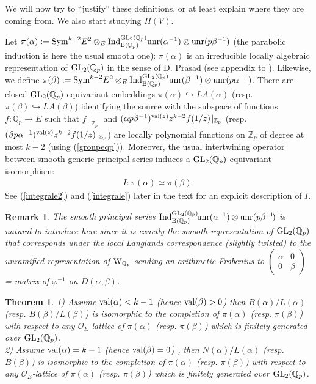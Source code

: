 \documentclass[11pt]{amsart}
\def\Z{{\mathbb Z}_p}
\def\Q{{\mathbb Q}_p}
\def\G{{\rm GL}_2(\Q)}
\def\B{{\rm B}(\Q)}
\def\O{{\mathcal O}_E}
\newtheorem{thm}[definit]{\bf{Theorem}}
\newtheorem{rem}[definit]{\bf{Remark}}
\begin{document}
We will now try to ``justify'' these definitions, or at least explain
where they are coming from. We also start studying $\Pi(V)$. 
 
Let $\pi(\alpha):={\rm Sym}^{k-2}E^2\otimes_E {\rm Ind}_{\B}^{\G}{\rm
  unr}(\alpha^{-1})\otimes {\rm unr}(p\beta^{-1})$ (the parabo\-lic
induction is here the usual smooth one): $\pi(\alpha)$ is an
irreducible locally algebraic representation of $\G$ in the sense of
D. Prasad (see appendix to \cite{ST2}). Likewise, we define
$\pi(\beta):={\rm Sym}^{k-2}E^2\otimes_E {\rm Ind}_{\B}^{\G}{\rm
  unr}(\beta^{-1})\otimes {\rm unr}(p\alpha^{-1})$. There are closed
$\G$-equivariant embeddings $\pi(\alpha)\hookrightarrow LA(\alpha)$
(resp. $\pi(\beta)\hookrightarrow LA(\beta)$) identifying the source
with the subspace of functions $f:\Q\rightarrow E$ such that
$f\!\mid_{\Z}$ and $(\alpha p\beta^{-1})^{{\rm
    val}(z)}z^{k-2}f(1/z)\!\mid_{\Z}$ (resp. $(\beta
p\alpha^{-1})^{{\rm val}(z)}z^{k-2}f(1/z)\!\mid_{\Z}$) are locally
polynomial functions on $\Z$ of degree at most $k-2$ (using
(\ref{groupeqp})). Moreover, the usual intertwining operator between
smooth generic principal series induces a $\G$-equivariant
isomorphism:  
\begin{eqnarray}\label{intertw} 
I:\pi(\alpha)\simeq \pi(\beta). 
\end{eqnarray} 
See (\ref{integrale2}) and (\ref{integrale}) later in the text for an
explicit description of $I$.  
 
\begin{rem} 
{\rm The smooth principal series ${\rm Ind}_{\B}^{\G}\!{\rm
    unr}(\alpha^{\!-1})\otimes {\rm unr}(p\beta^{\!-1}\!)$ is natural
  to introduce here since it is exactly the smooth representation of
  $\G$ that corresponds under the local Langlands correspondence
  (slightly twisted) to the unramified representation of ${\rm
    W}_{\Q}$ sending an arithmetic Frobenius to
  $\begin{pmatrix}\alpha&0 \\ 0&\beta\end{pmatrix}$= matrix of
    $\varphi^{-1}$ on $D(\alpha,\beta)$.}  
\end{rem} 
 
\begin{thm}\label{compl} 
1) Assume ${\rm val}(\alpha)<k-1$ (hence ${\rm val}(\beta)>0$) then
$B(\alpha)/L(\alpha)$ (resp. $B(\beta)/L(\beta)$) is isomorphic to the
completion of $\pi(\alpha)$ (resp. $\pi(\beta)$) with respect to any
$\O$-lattice of $\pi(\alpha)$ (resp. $\pi(\beta)$) which is finitely
generated over $\G$.\\  
2) Assume ${\rm val}(\alpha)=k-1$ (hence ${\rm val}(\beta)=0$) , then
$N(\alpha)/L(\alpha)$ (resp. $B(\beta)$) is isomorphic to the
completion of $\pi(\alpha)$ (resp. $\pi(\beta)$) with respect to any
$\O$-lattice of $\pi(\alpha)$ (resp. $\pi(\beta)$) which is finitely
generated over $\G$.  
\end{thm} 
 
\end{document}
